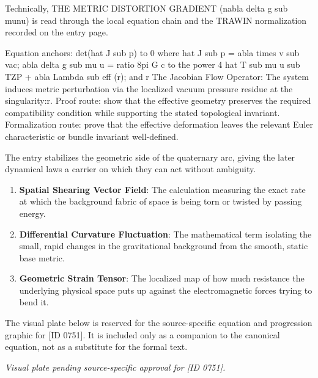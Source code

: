 Technically, THE METRIC DISTORTION GRADIENT (nabla delta g sub munu) is read through the local equation chain and the TRAWIN normalization recorded on the entry page.

Equation anchors: det(hat J sub p) to 0 where hat J sub p = abla times v sub vac; abla delta g sub mu u = ratio 8pi G c to the power 4 hat T sub mu u sub TZP + abla Lambda sub eff (r); and r The Jacobian Flow Operator: The system induces metric perturbation via the localized vacuum pressure residue at the singularity:r. Proof route: show that the effective geometry preserves the required compatibility condition while supporting the stated topological invariant. Formalization route: prove that the effective deformation leaves the relevant Euler characteristic or bundle invariant well-defined.

The entry stabilizes the geometric side of the quaternary arc, giving the later dynamical laws a carrier on which they can act without ambiguity.
\endgroup

\begin{enumerate}[leftmargin=1.6em,itemsep=6pt,topsep=4pt]
\item \textbf{Spatial Shearing Vector Field}: The calculation measuring the exact rate at which the background fabric of space is being torn or twisted by passing energy.
\item \textbf{Differential Curvature Fluctuation}: The mathematical term isolating the small, rapid changes in the gravitational background from the smooth, static base metric.
\item \textbf{Geometric Strain Tensor}: The localized map of how much resistance the underlying physical space puts up against the electromagnetic forces trying to bend it.
\end{enumerate}

\begingroup\footnotesize\sloppy
The visual plate below is reserved for the source-specific equation and progression graphic for [ID 0751]. It is included only as a companion to the canonical equation, not as a substitute for the formal text.
\par\endgroup
\begingroup\footnotesize\itshape
Visual plate pending source-specific approval for [ID 0751].
\par\endgroup

